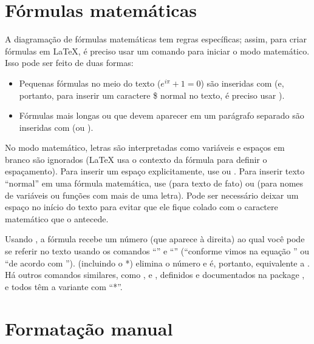 \section{Fórmulas matemáticas}

\enlargethispage{-.5\baselineskip}

A diagramação de fórmulas matemáticas tem regras específicas; assim, para
criar fórmulas em \LaTeX{}, é preciso usar um comando para iniciar o modo
matemático. Isso pode ser feito de duas formas:

\begin{itemize}
  \item Pequenas fórmulas no meio do texto ($e^{i\pi}+1=0$) são inseridas
  com  (e, portanto, para inserir um caractere \$
  normal no texto, é preciso usar \cmd{\sla{}\$}).

  \item Fórmulas mais longas ou que devem aparecer em um parágrafo
  separado são inseridas com  (ou
  ).
\end{itemize}

No modo matemático, letras são interpretadas como variáveis e espaços
em branco são ignorados (\LaTeX{} usa o contexto da fórmula para
definir o espaçamento). Para inserir um espaço explicitamente, use
 ou . Para inserir texto ``normal'' em
uma fórmula matemática, use  (para texto de fato)
ou  (para nomes de variáveis ou funções com
mais de uma letra). Pode ser necessário deixar um espaço no início do
texto para evitar que ele fique colado com o caractere matemático que
o antecede.

Usando , a fórmula recebe um número (que
aparece à direita) ao qual você pode se referir no texto usando os
comandos ``'' e ``'' (``\textsf{conforme
vimos na equação }'' ou
``\textsf{de acordo com }'').
 (incluindo o *) elimina o número e é,
portanto, equivalente a . Há outros
comandos similares, como ,  e ,
definidos e documentados na package , e todos têm
a variante com ``*''.

\section{Formatação manual}

